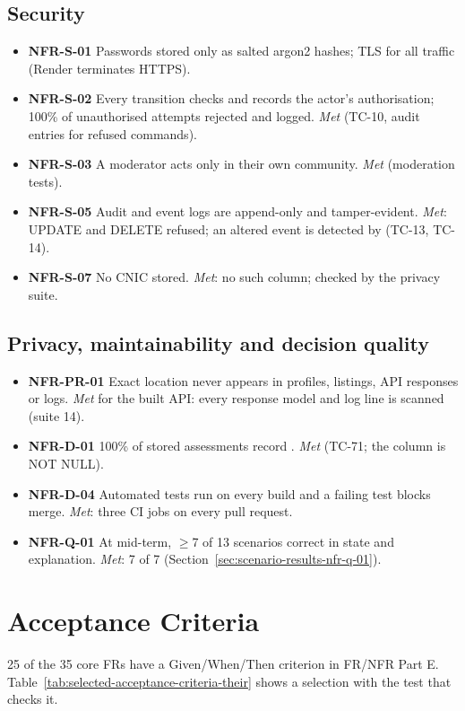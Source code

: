 \subsection{Security}\label{sec:security}
\begin{itemize}
\item \textbf{NFR-S-01} Passwords stored only as salted argon2 hashes; TLS for all traffic (Render terminates HTTPS).
\item \textbf{NFR-S-02} Every transition checks and records the actor's authorisation; 100\% of unauthorised attempts rejected and logged. \textit{Met} (TC-10, audit entries for refused commands).
\item \textbf{NFR-S-03} A moderator acts only in their own community. \textit{Met} (moderation tests).
\item \textbf{NFR-S-05} Audit and event logs are append-only and tamper-evident. \textit{Met}: UPDATE and DELETE refused; an altered event is detected by  (TC-13, TC-14).
\item \textbf{NFR-S-07} No CNIC stored. \textit{Met}: no such column; checked by the privacy suite.
\end{itemize}

\subsection{Privacy, maintainability and decision quality}\label{sec:privacy-maintainability-decision-quality}
\begin{itemize}
\item \textbf{NFR-PR-01} Exact location never appears in profiles, listings, API responses or logs. \textit{Met} for the built API: every response model and log line is scanned (suite 14).
\item \textbf{NFR-D-01} 100\% of stored assessments record . \textit{Met} (TC-71; the column is NOT NULL).
\item \textbf{NFR-D-04} Automated tests run on every build and a failing test blocks merge. \textit{Met}: three CI jobs on every pull request.
\item \textbf{NFR-Q-01} At mid-term, $\geq$7 of 13 scenarios correct in state and explanation. \textit{Met}: 7 of 7 (Section~\ref{sec:scenario-results-nfr-q-01}).
\end{itemize}

\section{Acceptance Criteria}\label{sec:acceptance-criteria}
25 of the 35 core FRs have a Given/When/Then criterion in FR/NFR Part E. Table~\ref{tab:selected-acceptance-criteria-their} shows a selection with the test that checks it.

